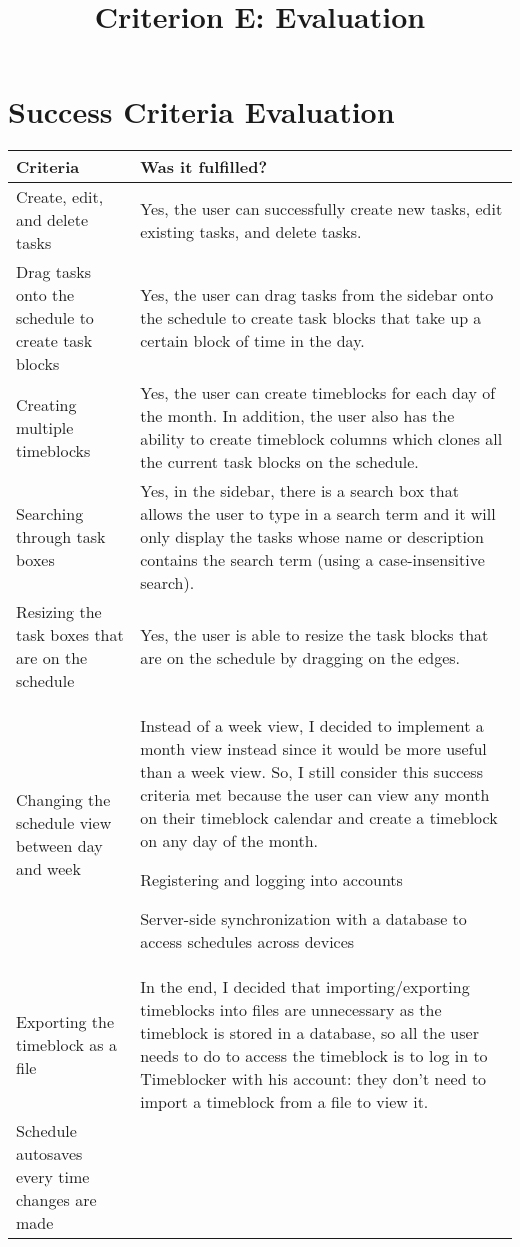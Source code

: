 \documentclass[12pt]{report}
\title{Criterion E: Evaluation}
\begin{document}
\centerline{\textcolor{msblue}{
		\textbf{\fontsize{13}{13}\MyTitle}
	}}


\section*{Success Criteria Evaluation}

\begin{tabularx}{\linewidth}{|X|X|}
	Criteria
	 & Was it fulfilled?
	\\\hline
	Create, edit, and delete tasks
	&
	Yes, the user can successfully create new tasks, edit existing tasks, and delete tasks.
	\\\hline
	Drag tasks onto the schedule to create task blocks
	&
	Yes, the user can drag tasks from the sidebar onto the schedule to create task blocks that take up a certain block of time in the day.
	\\\hline
	Creating multiple timeblocks
	&
	Yes, the user can create timeblocks for each day of the month. In addition, the user also has the ability to create timeblock columns which clones all the current task blocks on the schedule.
	\\\hline
	Searching through task boxes
	&
	Yes, in the sidebar, there is a search box that allows the user to type in a search term and it will only display the tasks whose name or description contains the search term (using a case-insensitive search).
	\\\hline
	Resizing the task boxes that are on the schedule
	&
	Yes, the user is able to resize the task blocks that are on the schedule by dragging on the edges.
	\\\hline
	Changing the schedule view between day and week
	&
	Instead of a week view, I decided to implement a month view instead since it would be more useful than a week view. So, I still consider this success criteria met because the user can view any month on their timeblock calendar and create a timeblock on any day of the month.

	\item Registering and logging into accounts
	\item Server-side synchronization with a database to access schedules across devices
	\\\hline
	Exporting the timeblock as a file
	&
	In the end, I decided that importing/exporting timeblocks into files are unnecessary as the timeblock is stored in a database, so all the user needs to do to access the timeblock is to log in to Timeblocker with his account: they don't need to import a timeblock from a file to view it.
	\\\hline
	\item Schedule autosaves every time changes are made
\end{tabularx}
\end{document}
